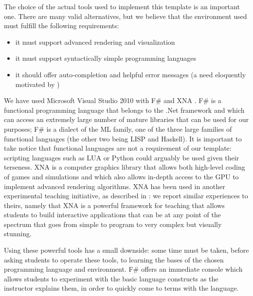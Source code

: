 The choice of the actual tools used to implement this template is an important one. There are many valid alternatives, but we believe that the environment used must fulfill the following requirements:
\begin{itemize}
\item it must support advanced rendering and visualization
\item it must support syntactically simple programming languages
\item it should offer auto-completion and helpful error messages (a need eloquently motivated by \cite{SICSC})
\end{itemize}

We have used Microsoft Visual Studio 2010 \cite{VISUAL_STUDIO} with F\# \cite{F_SHARP} and XNA \cite{XNA}. F\# is a functional programming language that belongs to the .Net framework and which can access an extremely large number of mature libraries that can be used for our purposes; F\# is a dialect of the ML family, one of the three large families of functional languages (the other two being LISP and Haskell). It is important to take notice that functional languages are not a requirement of our template: scripting languages such as LUA or Python could arguably be used given their terseness. XNA is a computer graphics library that allows both high-level coding of games and simulations and which also allows in-depth access to the GPU to implement advanced rendering algorithms. XNA has been used in another experimental teaching initiative, as described in \cite{GAME_PROG_FACULTY}: we report similar experiences to theirs, namely that XNA is a powerful framework for teaching that allows students to build interactive applications that can be at any point of the spectrum that goes from simple to program to very complex but visually stunning.

Using these powerful tools has a small downside: some time must be taken, before asking students to operate these tools, to learning the bases of the chosen programming language and environment. F\# offers an immediate console which allows students to experiment with the basic language constructs as the instructor explains them, in order to quickly come to terms with the language.
